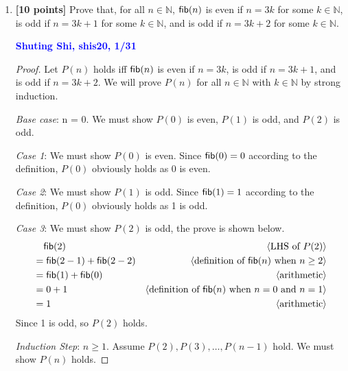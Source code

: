 \documentclass[11pt,fleqn]{article}
\newcommand{\mname}[1]{\mbox{\sf #1}}
\newcommand{\pnote}[1]{{\langle \text{#1} \rangle}}
\begin{document}
\begin{enumerate}
\begin{proof}
\medskip

Therefore, $P(n)$ holds for all $n \in \mathbb{N}$ by weak induction.
\end{proof}


  \bigskip

  \item \textbf{[10 points]} Prove that, for all $n \in \mathbb{N}$,
    $\mname{fib}(n)$ is even if $n = 3k$ for some $k \in \mathbb{N}$,
    is odd if $n = 3k + 1$ for some $k \in \mathbb{N}$, and is odd if
    $n = 3k + 2$ for some $k \in \mathbb{N}$.

  \bigskip

  \textcolor{blue}{\textbf{Shuting Shi, shis20, 1/31}}

 \begin{proof}
    Let $P(n)$ holds iff $\mname{fib} (n)$ is even if $n = 3k$, is odd if $n = 3k + 1$, and is odd if $n = 3k + 2$. 
    We will prove $P(n)$ for all $n \in \mathbb{N}$ with $k \in \mathbb{N}$ by strong induction.

    \medskip

    \emph{Base case}: n = 0. We must show $P(0)$ is even, $P(1)$ is odd, and $P(2)$ is odd.
    
    \emph{Case 1}: We must show $P(0)$ is even. Since $\mname{fib}(0) = 0$ according to the definition, $P(0)$ obviously holds as 0 is even.

    \emph{Case 2}: We must show $P(1)$ is odd. Since $\mname{fib}(1) = 1$ according to the definition, $P(0)$ obviously holds as 1 is odd.
    
    \emph{Case 3}: We must show $P(2)$ is odd, the prove is shown below.
    \begin{align*}
      & \phantom{{}=} \mname{fib}(2) 	& \pnote{LHS of $P(2)$}\\
      & = \mname{fib}(2 - 1) + \mname{fib}(2 - 2)	& \pnote{definition of $\mname{fib}(n)$ when $n \ge 2$}\\
      & = \mname{fib}(1) + \mname{fib}(0)	& \pnote{arithmetic}\\
      & = 0 + 1	& \pnote{definition of $\mname{fib}(n)$ when $n = 0$ and $n = 1$}\\
      & = 1	& \pnote{arithmetic}
    \end{align*}
    Since 1 is odd, so $P(2)$ holds.

    \medskip

    \emph{Induction Step}: $n \ge 1$. Assume $P(2), P(3),\ldots, P(n-1)$ hold. We must show $P(n)$ holds.
    

\end{proof}
\end{enumerate}
\end{document}
